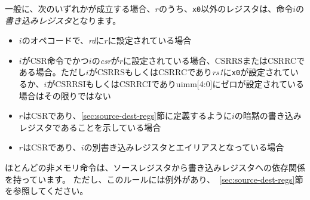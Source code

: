 一般に、次のいずれかが成立する場合、$r$のうち、{\tt x0}以外のレジスタは、命令$i$の{\em 書き込みレジスタ}となります。
\begin{itemize}
  \item $i$のオペコードで、{\em rd}に$r$に設定されている場合
  \item $i$がCSR命令でかつ$i$の{\em csr}が$r$に設定されている場合、CSRRSまたはCSRRCである場合。ただし$i$がCSRRSもしくはCSRRCであり{\em rs1}に{\tt x0}が設定されているか、$i$がCSRRSIもしくはCSRRCIでありuimm[4:0]にゼロが設定されている場合はその限りではない
  \item $r$はCSRであり、\ref{sec:source-dest-regs}節に定義するように$i$の暗黙の書き込みレジスタであることを示している場合
  \item $r$はCSRであり、$i$の別書き込みレジスタとエイリアスとなっている場合
\end{itemize}

\begin{comment}
Most non-memory instructions {\em carry a dependency} from each of their source registers to each of their destination registers.
However, there are exceptions to this rule; see Section~\ref{sec:source-dest-regs}
\end{comment}

ほとんどの非メモリ命令は、ソースレジスタから書き込みレジスタへの依存関係を持っています。
ただし、このルールには例外があり、~\ref{sec:source-dest-regs}節を参照してください。

\begin{comment}
Instruction $j$ has a {\em syntactic dependency} on instruction $i$ via destination register $s$ of $i$ and source register $r$ of $j$ if either of the following hold:
\begin{itemize}
  \item $s$ is the same as $r$, and no instruction program-ordered between $i$ and $j$ has $r$ as a destination register
  \item There is an instruction $m$ program-ordered between $i$ and $j$ such that all of the following hold:
    \begin{enumerate}
      \item $j$ has a syntactic dependency on $m$ via destination register $q$ and source register $r$
      \item $m$ has a syntactic dependency on $i$ via destination register $s$ and source register $p$
      \item $m$ carries a dependency from $p$ to $q$
    \end{enumerate}
\end{itemize}
\end{comment}

